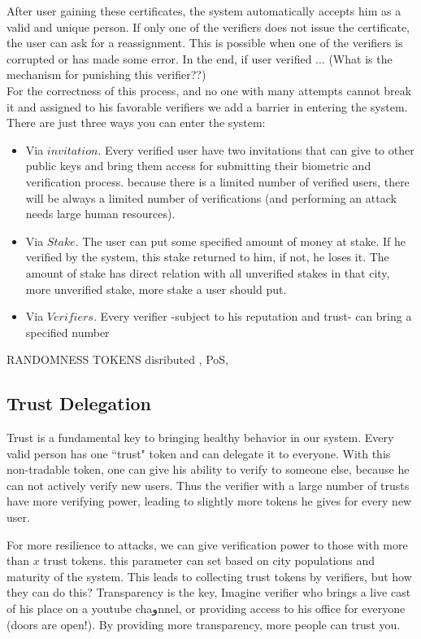 \documentclass[conference]{IEEEtran}
\begin{document}
After user gaining these certificates, the system automatically accepts him as a valid and unique person. If only one of the verifiers does not issue the certificate, the user can ask for a reassignment. This is possible when one of the verifiers is corrupted or has made some error. In the end, if user verified ... (What is the mechanism for punishing this verifier??)
\\
For the correctness of this process, and no one with many attempts cannot break it and assigned to his favorable verifiers we add a barrier in entering the system. There are just three ways you can enter the system:
\begin{itemize}
\item Via $invitation$. Every verified user have two invitations that can give to other public keys and bring them access for submitting their biometric and verification process. because there is a limited number of verified users, there will be always a limited number of verifications (and performing an attack needs large human resources).

\item Via $Stake$. The user can put some specified amount of money at stake. If he verified by the system, this stake returned to him, if not, he loses it. The amount of stake has direct relation with all unverified stakes in that city, more unverified stake, more stake a user should put.

\item Via $Verifiers$. Every verifier -subject to his reputation and trust- can bring a specified number  
\end{itemize}
RANDOMNESS TOKENS disributed , PoS, 

\subsection{Trust Delegation}
Trust is a fundamental key to bringing healthy behavior in our system. Every valid person has one ``trust" token and can delegate it to everyone. With this non-tradable token, one can give his ability to verify to someone else, because he can not actively verify new users. Thus the verifier with a large number of trusts have more verifying power, leading to slightly more tokens he gives for every new user.


For more resilience to attacks, we can give verification power to those with more than $x$ trust tokens. this parameter can set based on city populations and maturity of the system. This leads to collecting trust tokens by verifiers, but how they can do this? Transparency is the key, Imagine verifier who brings a live cast of his place on a youtube chaوnnel, or providing access to his office for everyone (doors are open!). By providing more transparency, more people can trust you.
\end{document}
